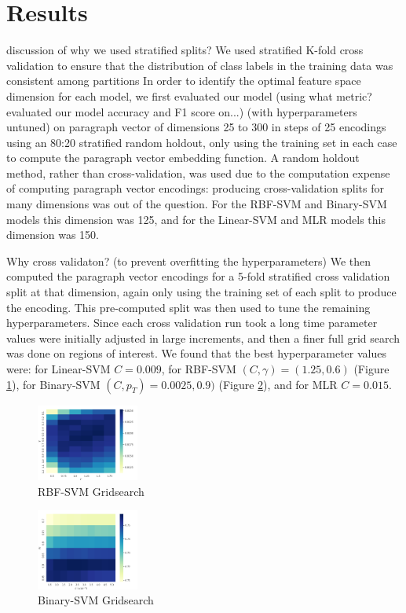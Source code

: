 \documentclass[11pt]{article}
\newcommand{\drafting}[1]{\textcolor{OliveGreen}{#1}}
\begin{document}
\section{Results}
\drafting{discussion of why we used stratified splits? We used stratified K-fold cross validation to ensure that the distribution of class labels in the training data was consistent among partitions}
In order to identify the optimal feature space dimension for each model, we first evaluated our model \drafting{(using what metric? evaluated our model accuracy and F1 score on...)} (with hyperparameters untuned) on paragraph vector of dimensions 25 to 300 in steps of 25 encodings using an 80:20 stratified random holdout, only using the training set in each case to compute the paragraph vector embedding function. A random holdout method, rather than cross-validation, was used due to the computation expense of computing paragraph vector encodings: producing cross-validation splits for many dimensions was out of the question. For the RBF-SVM and Binary-SVM models this dimension was 125, and for the Linear-SVM and MLR models this dimension was 150.

\drafting{Why cross validaton? (to prevent overfitting the hyperparameters)}
We then computed the paragraph vector encodings for a 5-fold stratified cross validation split at that dimension, again only using the training set of each split to produce the encoding. This pre-computed split was then used to tune the remaining hyperparameters. Since each cross validation run \drafting{took a long time} parameter values were initially adjusted in large increments, and then a finer full grid search was done on regions of interest. We found that the best hyperparameter values were: for Linear-SVM $C = 0.009$, for RBF-SVM $(C, \gamma) = (1.25, 0.6)$ (Figure \ref{fig:rbf-gridsearch}), for Binary-SVM $(C, p_T) = 0.0025, 0.9)$ (Figure \ref{fig:binary-gridsearch}), and for MLR $C = 0.015$.
\begin{figure}
	\centering
	\includegraphics[width = 0.3\textwidth]{fig-rbf-gridsearch.png}
	\caption{RBF-SVM Gridsearch}
	\label{fig:rbf-gridsearch}
\end{figure}

\begin{figure}
	\centering
	\includegraphics[width = 0.3\textwidth]{fig-binary-gridsearch.png}
	\caption{Binary-SVM Gridsearch}
	\label{fig:binary-gridsearch}
\end{figure}
\end{document}
